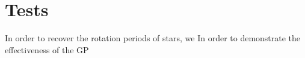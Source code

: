 \section{Tests}

In order to recover the rotation periods of stars, we
In order to demonstrate the effectiveness of the GP



% 

